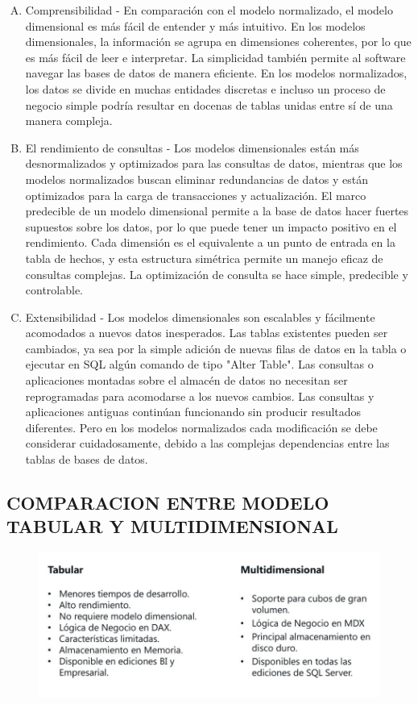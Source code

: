 \documentclass[11pt,a4paper]{article}
\begin{document}
	 	\begin{enumerate}[A.]
	 		\item Comprensibilidad - En comparación con el modelo normalizado, el modelo dimensional es más fácil de entender y más intuitivo. En los modelos dimensionales, la información se agrupa en dimensiones coherentes, por lo que es más fácil de leer e interpretar. La simplicidad también permite al software navegar las bases de datos de manera eficiente. En los modelos normalizados, los datos se divide en muchas entidades discretas e incluso un proceso de negocio simple podría resultar en docenas de tablas unidas entre sí de una manera compleja.
	 		\item El rendimiento de consultas - Los modelos dimensionales están más desnormalizados y optimizados para las consultas de datos, mientras que los modelos normalizados buscan eliminar redundancias de datos y están optimizados para la carga de transacciones y actualización. El marco predecible de un modelo dimensional permite a la base de datos hacer fuertes supuestos sobre los datos, por lo que puede tener un impacto positivo en el rendimiento. Cada dimensión es el equivalente a un punto de entrada en la tabla de hechos, y esta estructura simétrica permite un manejo eficaz de consultas complejas. La optimización de consulta se hace simple, predecible y controlable.
	 		\item Extensibilidad - Los modelos dimensionales son escalables y fácilmente acomodados a nuevos datos inesperados. Las tablas existentes pueden ser cambiados, ya sea por la simple adición de nuevas filas de datos en la tabla o ejecutar en SQL algún comando de tipo "Alter Table". Las consultas o aplicaciones montadas sobre el almacén de datos no necesitan ser reprogramadas para acomodarse a los nuevos cambios. Las consultas y aplicaciones antiguas continúan funcionando sin producir resultados diferentes. Pero en los modelos normalizados cada modificación se debe considerar cuidadosamente, debido a las complejas dependencias entre las tablas de bases de datos.
	 	\end{enumerate}
	
		\subsection{COMPARACION ENTRE MODELO TABULAR Y MULTIDIMENSIONAL}

			\begin{figure}[H] \includegraphics[width=15cm]{./IMAGENES/imgleydi2} \end{figure}
\end{document}
